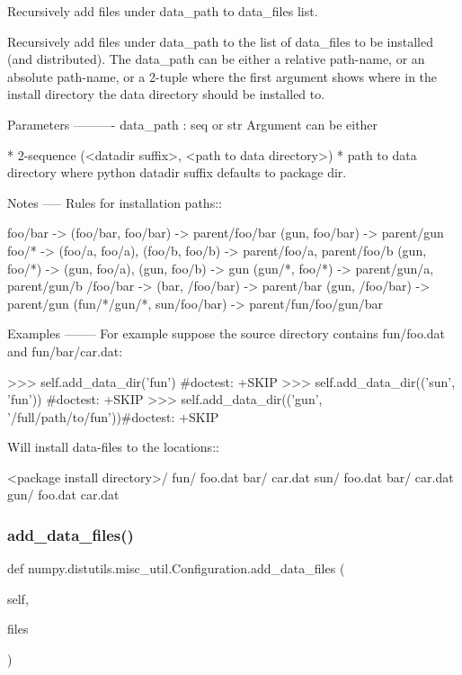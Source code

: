 \begin{DoxyVerb}Recursively add files under data_path to data_files list.

Recursively add files under data_path to the list of data_files to be
installed (and distributed). The data_path can be either a relative
path-name, or an absolute path-name, or a 2-tuple where the first
argument shows where in the install directory the data directory
should be installed to.

Parameters
----------
data_path : seq or str
    Argument can be either

* 2-sequence (<datadir suffix>, <path to data directory>)
* path to data directory where python datadir suffix defaults
  to package dir.

Notes
-----
Rules for installation paths::

    foo/bar -> (foo/bar, foo/bar) -> parent/foo/bar
    (gun, foo/bar) -> parent/gun
    foo/* -> (foo/a, foo/a), (foo/b, foo/b) -> parent/foo/a, parent/foo/b
    (gun, foo/*) -> (gun, foo/a), (gun, foo/b) -> gun
    (gun/*, foo/*) -> parent/gun/a, parent/gun/b
    /foo/bar -> (bar, /foo/bar) -> parent/bar
    (gun, /foo/bar) -> parent/gun
    (fun/*/gun/*, sun/foo/bar) -> parent/fun/foo/gun/bar

Examples
--------
For example suppose the source directory contains fun/foo.dat and
fun/bar/car.dat:

>>> self.add_data_dir('fun')                       #doctest: +SKIP
>>> self.add_data_dir(('sun', 'fun'))              #doctest: +SKIP
>>> self.add_data_dir(('gun', '/full/path/to/fun'))#doctest: +SKIP

Will install data-files to the locations::

    <package install directory>/
      fun/
foo.dat
bar/
  car.dat
      sun/
foo.dat
bar/
  car.dat
      gun/
foo.dat
car.dat\end{DoxyVerb}
 \mbox{\label{classnumpy_1_1distutils_1_1misc__util_1_1Configuration_a5e6c51717da5a84459ef592c7d6f1e33}} 
\subsubsection{\texorpdfstring{add\+\_\+data\+\_\+files()}{add\_data\_files()}}
{\footnotesize\ttfamily def numpy.\+distutils.\+misc\+\_\+util.\+Configuration.\+add\+\_\+data\+\_\+files (\begin{DoxyParamCaption}\item[{}]{self,  }\item[{}]{files }\end{DoxyParamCaption})}

